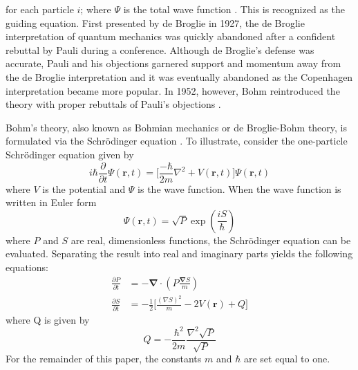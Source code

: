\documentclass[10pt, reqno]{article}
\begin{document}
  \noindent
  for each particle $i$; where $\Psi$ is the total wave function \cite{guay}.
  This is recognized as the guiding equation.
  First presented by de Broglie in 1927, the de Broglie interpretation of quantum mechanics was quickly abandoned after a confident rebuttal by Pauli during a conference.
  Although de Broglie's defense was accurate, Pauli and his objections garnered support and momentum away from the de Broglie interpretation
    and it was eventually abandoned as the Copenhagen interpretation became more popular.
  In 1952, however, Bohm reintroduced the theory with proper rebuttals of Pauli's objections \cite{bohm}.

  Bohm's theory, also known as Bohmian mechanics or de Broglie-Bohm theory, is formulated via the Schrödinger equation \cite{bohm}.
  To illustrate, consider the one-particle Schrödinger equation given by 
    \begin{equation}
      i \hbar \frac{\partial}{\partial t} \Psi(\mathbf{r},t) = \Bigg[ \frac{-\hbar}{2m} \nabla^2 + V(\mathbf{r},t) \Bigg] \Psi(\mathbf{r},t)
    \end{equation}
  where $V$ is the potential and $\Psi$ is the wave function.
  When the wave function is written in Euler form 
    \begin{equation}
      \Psi(\mathbf{r},t) = \sqrt{P} \exp(\frac{iS}{\hbar}) 
    \end{equation}
  where $P$ and $S$ are real, dimensionless functions, the Schrödinger equation can be evaluated.
  Separating the result into real and imaginary parts yields the following equations:
  \begin{align} 
    \frac{\partial P}{\partial t} &= - \mathbf{\nabla} \cdot (P \frac{\mathbf{\nabla} S}{m}) \label{eq:bohm1} \\
    \frac{\partial S}{\partial t} &= - \frac{1}{2} \Bigg[ \frac{(\nabla S)^2}{m} - 2V(\mathbf{r}) + Q \label{eq:bohm2} \Bigg] 
  \end{align}
  where Q is given by
  \begin{equation} \label{eq:quantumpotential}
    Q = -\frac{\hbar^2}{2m}\frac{\nabla^2 \sqrt{P}}{\sqrt{P}}
  \end{equation}
  For the remainder of this paper, the constants $m$ and $\hbar$ are set equal to one.
    
\end{document}
